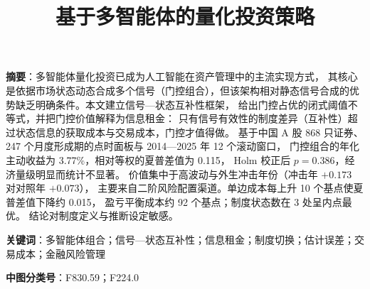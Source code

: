 \documentclass[UTF8,a4paper,zihao=-4]{ctexart}
\title{\bfseries 基于多智能体的量化投资策略}
\author{}
\date{}
\theoremstyle{plain}
\theoremstyle{definition}
\theoremstyle{remark}
\begin{document}
\maketitle
\thispagestyle{empty}

\noindent\textbf{摘\quad 要}：多智能体量化投资已成为人工智能在资产管理中的主流实现方式，
其核心是依据市场状态动态合成多个信号（门控组合），但该架构相对静态信号合成的优势缺乏明确条件。本文建立信号—状态互补性框架，
给出门控占优的闭式阈值不等式，并把门控价值解释为信息租金：
只有信号有效性的制度差异（互补性）超过状态信息的获取成本与交易成本，门控才值得做。
基于中国 A 股 868 只证券、247 个月度形成期的点时面板与 2014—2025 年 12 个滚动窗口，
门控组合的年化主动收益为 3.77\%，相对等权的夏普差值为 0.115，
Holm 校正后 $p=0.386$，经济量级明显而统计不显著。
价值集中于高波动与外生冲击年份（冲击年 $+0.173$ 对对照年 $+0.073$），
主要来自二阶风险配置渠道。单边成本每上升 10 个基点使夏普差值下降约 0.015，
盈亏平衡成本约 92 个基点；制度状态数在 3 处呈内点最优。
结论对制度定义与推断设定敏感。

\vspace{0.4em}
\noindent\textbf{关键词}：多智能体组合；信号—状态互补性；信息租金；制度切换；估计误差；交易成本；金融风险管理

\vspace{0.3em}
\noindent\textbf{中图分类号}：F830.59；F224.0
\end{document}

